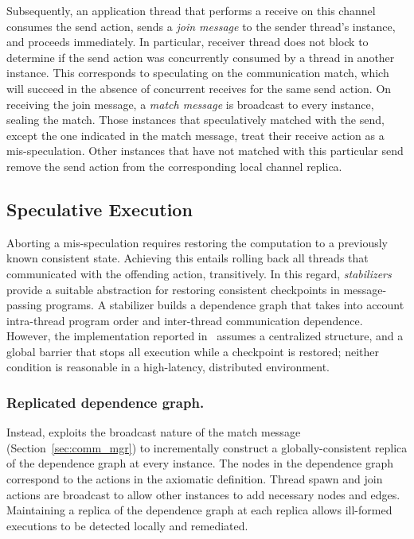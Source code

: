 Subsequently, an application thread that performs a receive on this channel
consumes the send action, sends a \emph{join message} to the sender thread's
instance, and proceeds immediately. In particular, receiver thread does not
block to determine if the send action was concurrently consumed by a thread in
another instance. This corresponds to speculating on the communication match,
which will succeed in the absence of concurrent receives for the same send
action. On receiving the join message, a \emph{match message} is broadcast to
every instance, sealing the match. Those instances that speculatively matched
with the send, except the one indicated in the match message, treat their
receive action as a mis-speculation. Other instances that have not matched with
this particular send remove the send action from the corresponding local
channel replica.

\subsection{Speculative Execution}

Aborting a mis-speculation requires restoring the computation to a previously
known consistent state. Achieving this entails rolling back all threads that
communicated with the offending action, transitively. In this regard,
\emph{stabilizers}~\cite{Ziarek10} provide a suitable abstraction for restoring
consistent checkpoints in message-passing programs.  A stabilizer builds a
dependence graph that takes into account intra-thread program order and
inter-thread communication dependence. However, the implementation reported
in~\cite{Ziarek10} assumes a centralized structure, and a global barrier that
stops all execution while a checkpoint is restored; neither condition is
reasonable in a high-latency, distributed environment.

\subsubsection{Replicated dependence graph.} Instead, \rxcml exploits the
broadcast nature of the match message (Section~\ref{sec:comm_mgr}) to
incrementally construct a globally-consistent replica of the dependence graph
at every instance. The nodes in the dependence graph correspond to the actions
in the axiomatic definition. Thread spawn and join actions are broadcast to
allow other instances to add necessary nodes and edges. Maintaining a replica
of the dependence graph at each replica allows ill-formed executions to be
detected locally and remediated.

